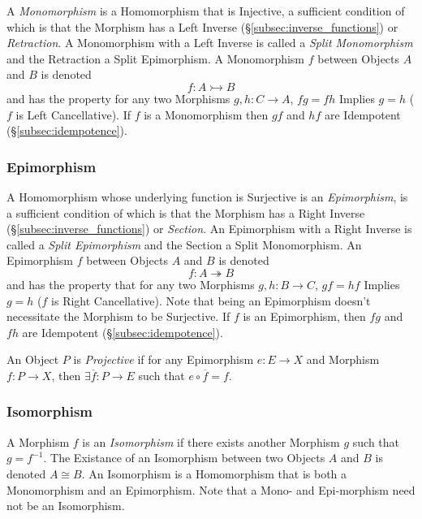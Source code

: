 A \emph{Monomorphism} is a Homomorphism that is Injective, a
sufficient condition of which is that the Morphism has a Left Inverse
(\S\ref{subsec:inverse_functions}) or \emph{Retraction}. A
Monomorphism with a Left Inverse is called a \emph{Split Monomorphism}
and the Retraction a Split Epimorphism. A Monomorphism $f$ between
Objects $A$ and $B$ is denoted
\[
    f : A \rightarrowtail B
\]
and has the property for any two Morphisms $g, h : C \rightarrow A$,
$fg = fh$ Implies $g = h$ ($f$ is Left Cancellative). If $f$ is a
Monomorphism then $gf$ and $hf$ are Idempotent
(\S\ref{subsec:idempotence}).



\subsubsection{Epimorphism}\label{subsec:epimorphism}

A Homomorphism whose underlying function is Surjective is an
\emph{Epimorphism}, is a sufficient condition of which is that the
Morphism has a Right Inverse (\S\ref{subsec:inverse_functions}) or
\emph{Section}. An Epimorphism with a Right Inverse is called a
\emph{Split Epimorphism} and the Section a Split Monomorphism. An
Epimorphism $f$ between Objects $A$ and $B$ is denoted
\[
    f : A \twoheadrightarrow B
\]
and has the property that for any two Morphisms $g, h : B \rightarrow
C$, $gf = hf$ Implies $g = h$ ($f$ is Right Cancellative). Note that
being an Epimorphism doesn't necessitate the Morphism to be
Surjective. If $f$ is an Epimorphism, then $fg$ and $fh$ are
Idempotent (\S\ref{subsec:idempotence}).

An Object $P$ is \emph{Projective} if for any Epimorphism $e : E
\rightarrow X$ and Morphism $f : P \rightarrow X$, then $\exists
\overline{f} : P \rightarrow E$ such that $e \circ \overline{f} = f$.



\subsubsection{Isomorphism}\label{subsec:isomorphism}

A Morphism $f$ is an \emph{Isomorphism} if there exists another
Morphism $g$ such that $g = f^{-1}$. The Existance of an Isomorphism
between two Objects $A$ and $B$ is denoted $A \cong B$. An Isomorphism
is a Homomorphism that is both a Monomorphism and an Epimorphism. Note
that a Mono- and Epi-morphism need not be an Isomorphism.

